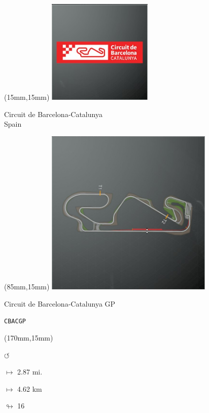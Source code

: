 \begin{textblock*}{60mm}(15mm,15mm)%
\includegraphics[width=50mm]{LG/2015-05-20_00078.png}
\par Circuit de Barcelona-Catalunya\\ Spain
\end{textblock*}
\begin{textblock*}{80mm}(85mm,15mm)%
\includegraphics[width=80mm]{TR/2015-05-20_00018.png}
\centerline{Circuit de Barcelona-Catalunya GP}
\par\hfill\tiny\tt CBACGP\\
\end{textblock*}
\begin{textblock*}{30mm}(170mm,15mm)%
\par \Huge$\circlearrowleft$
\Large
\par$\mapsto$ 2.87 mi.
\par$\mapsto$ 4.62 km
\par$\looparrowright$ 16
\end{textblock*}
